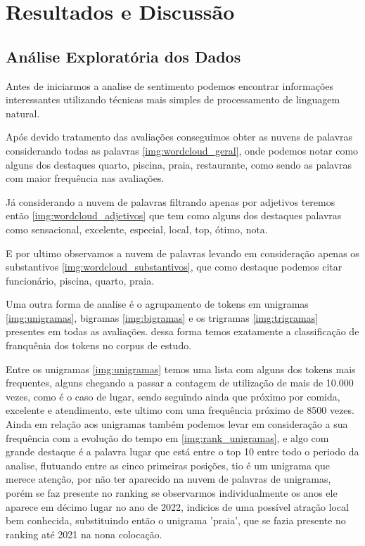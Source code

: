 \chapter{Resultados e Discussão}
\label{cap:resultados}


\section{Análise Exploratória dos Dados}
\label{cap:resultados:sec:analise_exploratoria}

Antes de iniciarmos a analise de sentimento podemos encontrar informações interessantes utilizando técnicas mais simples de processamento de linguagem natural.

Após devido tratamento das avaliações conseguimos obter as nuvens de palavras considerando todas as palavras \ref{img:wordcloud_geral}, onde podemos notar como alguns dos destaques quarto, piscina, praia, restaurante, como sendo as palavras com maior frequência nas avaliações.


Já considerando a nuvem de palavras filtrando apenas por adjetivos teremos então \ref{img:wordcloud_adjetivos} que tem como alguns dos destaques palavras como sensacional, excelente, especial, local, top, ótimo, nota.

E por ultimo observamos a nuvem de palavras levando em consideração apenas os substantivos \ref{img:wordcloud_substantivos}, que como destaque podemos citar funcionário, piscina, quarto, praia.

Uma outra forma de analise é o agrupamento de tokens em unigramas \ref{img:unigramas}, bigramas \ref{img:bigramas} e os trigramas \ref{img:trigramas} presentes em todas as avaliações. dessa forma temos exatamente a classificação de franquênia dos tokens no corpus de estudo.

Entre os unigramas \ref{img:unigramas} temos uma lista com alguns dos tokens mais frequentes, alguns chegando a passar a contagem de utilização de mais de 10.000 vezes, como é o caso de lugar, sendo seguindo ainda que próximo por comida, excelente e atendimento, este ultimo com uma frequência próximo de 8500 vezes. Ainda em relação aos unigramas também podemos levar em consideração a sua frequência com a evolução do tempo em \ref{img:rank_unigramas}, e algo com grande destaque é a palavra lugar que está entre o top 10 entre todo o periodo da analise, flutuando entre as cinco primeiras posições, tio é um unigrama que merece atenção, por não ter aparecido na nuvem de palavras de unigramas, porém se faz presente no ranking se observarmos individualmente os anos ele aparece em décimo lugar no ano de 2022, indicios de uma possível atração local bem conhecida, substituindo então o unigrama 'praia', que se fazia presente no ranking até 2021 na nona colocação.

